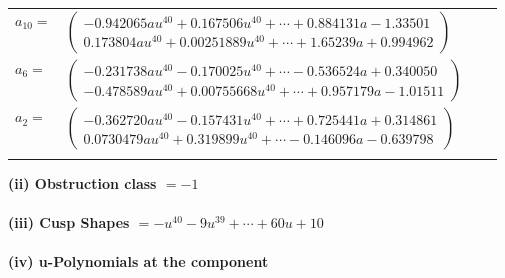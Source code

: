 \documentclass[1p]{elsarticle_modified}
\theoremstyle{definition}
\begin{document}
\begin{tabular}{m{7pt} m{180pt} m{7pt} m{180pt} }
\flushright $a_{10}=$&$\begin{pmatrix}-0.942065 a u^{40}+0.167506 u^{40}+\cdots+0.884131 a-1.33501\\0.173804 a u^{40}+0.00251889 u^{40}+\cdots+1.65239 a+0.994962\end{pmatrix}$ \\
\flushright $a_{6}=$&$\begin{pmatrix}-0.231738 a u^{40}-0.170025 u^{40}+\cdots-0.536524 a+0.340050\\-0.478589 a u^{40}+0.00755668 u^{40}+\cdots+0.957179 a-1.01511\end{pmatrix}$ \\
\flushright $a_{2}=$&$\begin{pmatrix}-0.362720 a u^{40}-0.157431 u^{40}+\cdots+0.725441 a+0.314861\\0.0730479 a u^{40}+0.319899 u^{40}+\cdots-0.146096 a-0.639798\end{pmatrix}$\\&\end{tabular}
\flushleft \textbf{(ii) Obstruction class $= -1$}\\~\\
\flushleft \textbf{(iii) Cusp Shapes $= - u^{40}-9 u^{39}+\cdots+60 u+10$}\\~\\
\newpage\renewcommand{\arraystretch}{1}
\flushleft \textbf{(iv) u-Polynomials at the component}\newline \\
\end{document}
